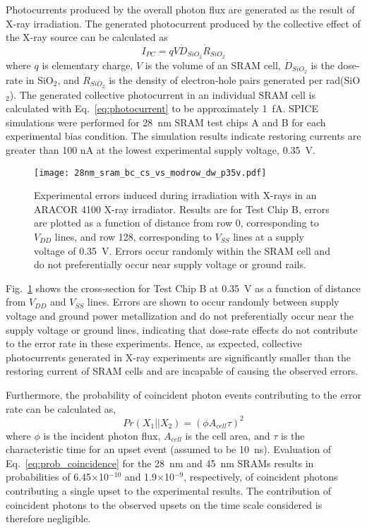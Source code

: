 Photocurrents produced by the overall photon flux are generated as the result of X-ray irradiation. 
The generated photocurrent produced by the collective effect of the X-ray source can be calculated as%
\begin{equation}
    \label{eq:photocurrent}
    I_{PC} = q V \dot{D}_{SiO_2} \dot{R}_{SiO_2}
\end{equation}
where $q$ is elementary charge, $V$ is the volume of an SRAM cell, $\dot{D}_{SiO_2}$ is the dose-rate in SiO$_2$, and $\dot{R}_{SiO_2}$ is the density of electron-hole pairs generated per rad(SiO$_2$). 
The generated collective photocurrent in an individual SRAM cell is calculated with Eq.~\ref{eq:photocurrent} to be approximately 1~fA. 
SPICE simulations were performed for 28~nm SRAM test chips A and B for each experimental bias condition. 
The simulation results indicate restoring currents are greater than 100 nA at the lowest experimental supply voltage, 0.35~V. 
\begin{figure}[tb]
    \begin{center}
        \texttt{[image: 28nm\_sram\_bc\_cs\_vs\_modrow\_dw\_p35v.pdf]}
    \end{center}
    \caption{Experimental errors induced during irradiation with X-rays in an ARACOR 4100 X-ray irradiator. Results are for Test Chip B, errors are plotted as a function of distance from row 0, corresponding to $V_{DD}$ lines, and row 128, corresponding to $V_{SS}$ lines at a supply voltage of 0.35~V. Errors occur randomly within the SRAM cell and do not preferentially occur near supply voltage or ground rails.}
    \label{fig:28nm_bc_cs_vs_modrow_dw_p35v}
\end{figure}
Fig.~\ref{fig:28nm_bc_cs_vs_modrow_dw_p35v} shows the cross-section for Test Chip B at 0.35~V as a function of distance from $V_{DD}$ and $V_{SS}$ lines.
Errors are shown to occur randomly between supply voltage and ground power metallization and do not preferentially occur near the supply voltage or ground lines, indicating that dose-rate effects do not contribute to the error rate in these experiments.
Hence, as expected, collective photocurrents generated in X-ray experiments are significantly smaller than the restoring current of SRAM cells and are incapable of causing the observed errors.

Furthermore, the probability of coincident photon events contributing to the error rate can be calculated as,
\begin{equation}
    \label{eq:prob_coincidence}
    Pr(X_1||X_2) = (\phi A_{cell} \tau)^2
\end{equation}
where $\phi$ is the incident photon flux, $A_{cell}$ is the cell area, and $\tau$ is the characteristic time for an upset event (assumed to be 10~ns). 
Evaluation of Eq.~\ref{eq:prob_coincidence} for the 28~nm and 45~nm SRAMs results in probabilities of 6.45$\times$10$^{-10}$ and 1.9$\times$10$^{-9}$, respectively, of coincident photons contributing a single upset to the experimental results. 
The contribution of coincident photons to the observed upsets on the time scale considered is therefore negligible.

